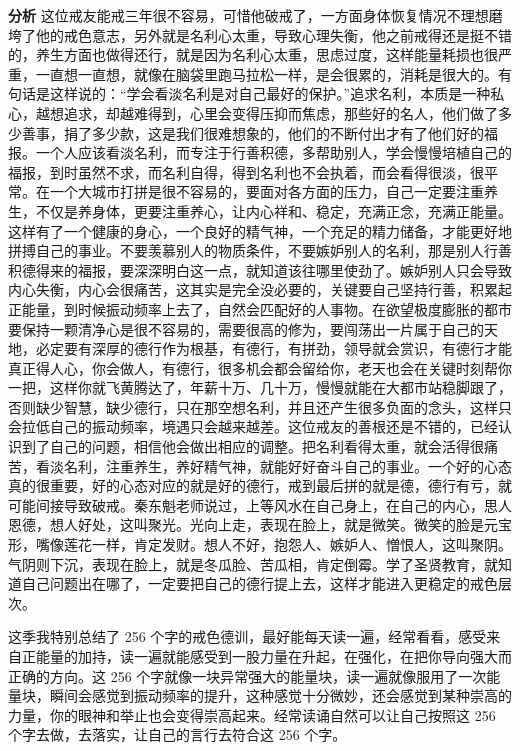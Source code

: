 \begin{case}
    \textbf{分析} 这位戒友能戒三年很不容易，可惜他破戒了，一方面身体恢复情况不理想磨垮了他的戒色意志，另外就是名利心太重，导致心理失衡，他之前戒得还是挺不错的，养生方面也做得还行，就是因为名利心太重，思虑过度，这样能量耗损也很严重，一直想一直想，就像在脑袋里跑马拉松一样，是会很累的，消耗是很大的。有句话是这样说的：“学会看淡名利是对自己最好的保护。”追求名利，本质是一种私心，越想追求，却越难得到，心里会变得压抑而焦虑，那些好的名人，他们做了多少善事，捐了多少款，这是我们很难想象的，他们的不断付出才有了他们好的福报。一个人应该看淡名利，而专注于行善积德，多帮助别人，学会慢慢培植自己的福报，到时虽然不求，而名利自得，得到名利也不会执着，而会看得很淡，很平常。在一个大城市打拼是很不容易的，要面对各方面的压力，自己一定要注重养生，不仅是养身体，更要注重养心，让内心祥和、稳定，充满正念，充满正能量。这样有了一个健康的身心，一个良好的精气神，一个充足的精力储备，才能更好地拼搏自己的事业。不要羡慕别人的物质条件，不要嫉妒别人的名利，那是别人行善积德得来的福报，要深深明白这一点，就知道该往哪里使劲了。嫉妒别人只会导致内心失衡，内心会很痛苦，这其实是完全没必要的，关键要自己坚持行善，积累起正能量，到时候振动频率上去了，自然会匹配好的人事物。在欲望极度膨胀的都市要保持一颗清净心是很不容易的，需要很高的修为，要闯荡出一片属于自己的天地，必定要有深厚的德行作为根基，有德行，有拼劲，领导就会赏识，有德行才能真正得人心，你会做人，有德行，很多机会都会留给你，老天也会在关键时刻帮你一把，这样你就飞黄腾达了，年薪十万、几十万，慢慢就能在大都市站稳脚跟了，否则缺少智慧，缺少德行，只在那空想名利，并且还产生很多负面的念头，这样只会拉低自己的振动频率，境遇只会越来越差。这位戒友的善根还是不错的，已经认识到了自己的问题，相信他会做出相应的调整。把名利看得太重，就会活得很痛苦，看淡名利，注重养生，养好精气神，就能好好奋斗自己的事业。一个好的心态真的很重要，好的心态对应的就是好的德行，戒到最后拼的就是德，德行有亏，就可能间接导致破戒。秦东魁老师说过，上等风水在自己身上，在自己的内心，思人恩德，想人好处，这叫聚光。光向上走，表现在脸上，就是微笑。微笑的脸是元宝形，嘴像莲花一样，肯定发财。想人不好，抱怨人、嫉妒人、憎恨人，这叫聚阴。气阴则下沉，表现在脸上，就是冬瓜脸、苦瓜相，肯定倒霉。学了圣贤教育，就知道自己问题出在哪了，一定要把自己的德行提上去，这样才能进入更稳定的戒色层次。
\end{case}

这季我特别总结了 256 个字的戒色德训，最好能每天读一遍，经常看看，感受来自正能量的加持，读一遍就能感受到一股力量在升起，在强化，在把你导向强大而正确的方向。这 256 个字就像一块异常强大的能量块，读一遍就像服用了一次能量块，瞬间会感觉到振动频率的提升，这种感觉十分微妙，还会感觉到某种崇高的力量，你的眼神和举止也会变得崇高起来。经常读诵自然可以让自己按照这 256 个字去做，去落实，让自己的言行去符合这 256 个字。

